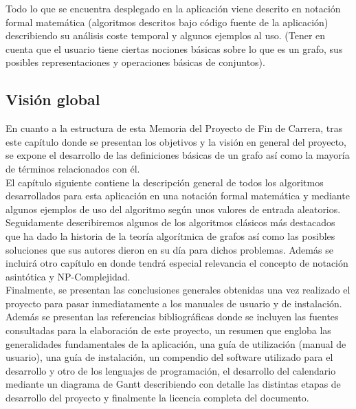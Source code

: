 \documentclass[a4paper,12pt]{article}
\begin{document}
Todo lo que se encuentra desplegado en la aplicación viene descrito en notación formal matemática (algoritmos descritos bajo código fuente de la aplicación) describiendo su análisis coste temporal y algunos ejemplos al uso. (Tener en cuenta que el usuario tiene ciertas nociones básicas sobre lo que es un grafo, sus posibles representaciones y operaciones básicas de conjuntos).\\

\subsection{Visión global}

En cuanto a la estructura de esta Memoria del Proyecto de Fin de Carrera, tras este capítulo donde se presentan los objetivos y la visión en general del proyecto, se expone el desarrollo de las definiciones básicas de un grafo así como la mayoría de términos relacionados con él.\\

El capítulo siguiente contiene la descripción general de todos los algoritmos desarrollados para esta aplicación en una notación formal matemática y mediante algunos ejemplos de uso del algoritmo según unos valores de entrada aleatorios. \\

Seguidamente describiremos algunos de los algoritmos clásicos más destacados que ha dado la historia de la teoría algorítmica de grafos así como las posibles soluciones que sus autores dieron en su día para dichos problemas. Además se incluirá otro capítulo en donde tendrá especial relevancia el concepto de notación asintótica y NP-Complejidad. \\

Finalmente, se presentan las conclusiones generales obtenidas una vez realizado el proyecto para pasar inmediatamente a los manuales de usuario y de instalación. \\

Además se presentan las referencias bibliográficas donde se incluyen las fuentes consultadas para la elaboración de este proyecto, un resumen que engloba las generalidades fundamentales de la aplicación, una guía de utilización (manual de usuario), una guía de instalación, un compendio del software utilizado para el desarrollo y otro de los lenguajes de programación, el desarrollo del calendario mediante un diagrama de Gantt describiendo con detalle las distintas etapas de desarrollo del proyecto y finalmente la licencia completa del documento. \\
\end{document}
